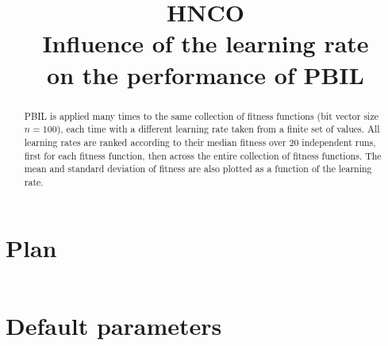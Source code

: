 \documentclass[a4paper]{article}
\begin{document}

\title{HNCO\\
  Influence of the learning rate\\
  on the performance of PBIL}
\maketitle

\begin{abstract}
  PBIL is applied many times to the same collection of fitness
  functions (bit vector size $n = 100$), each time with a different
  learning rate taken from a finite set of values. All learning rates
  are ranked according to their median fitness over 20 independent
  runs, first for each fitness function, then across the entire
  collection of fitness functions. The mean and standard deviation of
  fitness are also plotted as a function of the learning rate.
\end{abstract}

\tableofcontents

\newpage

\section{Plan}

\inputminted[breaklines=true]{json}{../plan-compact.json}



\newpage

\section{Default parameters}

\inputminted[breaklines=true]{text}{../log.default}
\end{document}

